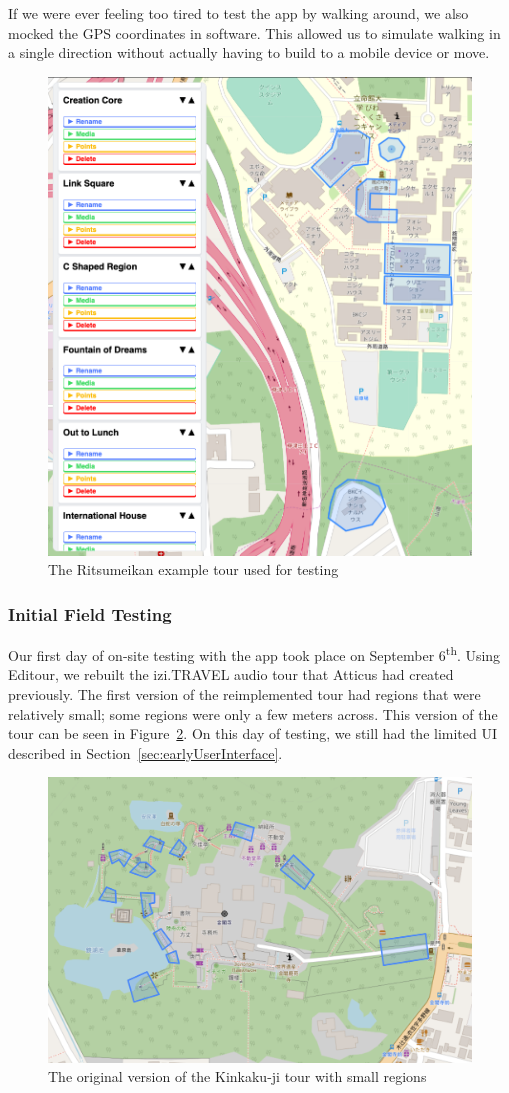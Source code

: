 \documentclass[a4paper, 10pt, american, titlepage]{article}
\begin{document}
If we were ever feeling too tired to test the app by walking around, we also
mocked the GPS coordinates in software. This allowed us to simulate walking in a
single direction without actually having to build to a mobile device or move.

\begin{figure}[h]
	\centering
	\includegraphics[width=.5\textwidth]{ritsu-tour.png}
	\caption{The Ritsumeikan example tour used for testing}
	\label{fig:ritsuTour}
\end{figure}

\subsubsection{Initial Field Testing}
\label{sec:initialFieldTesting}

Our first day of on-site testing with the app took place on September
6\textsuperscript{th}. Using Editour, we rebuilt the izi.TRAVEL audio tour that
Atticus had created previously. The first version of the reimplemented tour had
regions that were relatively small; some regions were only a few meters across.
This version of the tour can be seen in Figure~\ref{fig:kinkakujiTour}. On this
day of testing, we still had the limited UI described in
Section~\ref{sec:earlyUserInterface}.

\begin{figure}[h]
	\centering
	\includegraphics[width=\textwidth]{kinkakuji-tour.png}
	\caption[The original version of the Kinkaku-ji tour]{The original version
		of the Kinkaku-ji tour with small regions}
	\label{fig:kinkakujiTour}
\end{figure}
\end{document}
